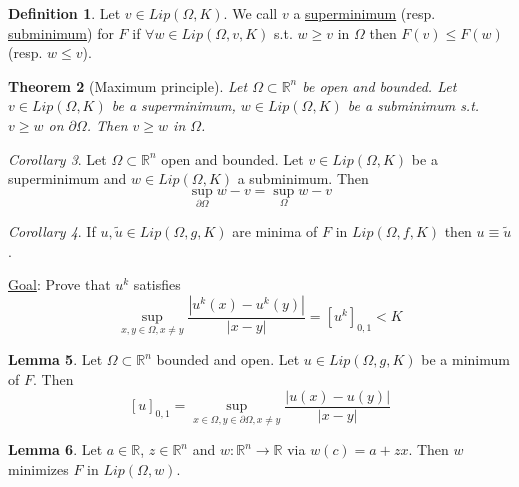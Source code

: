 \documentclass[a4paper, 12pt]{article}
\theoremstyle{plain}
\newtheorem{theorem}{Theorem}[section] %
\theoremstyle{definition}
\newtheorem{definition}[theorem]{Definition} %
\theoremstyle{lemma}
\newtheorem{lemma}[theorem]{Lemma}
\theoremstyle{remark}
\theoremstyle{corollary}
\newtheorem{corollary}[theorem]{Corollary}
\theoremstyle{example}
\begin{document}
	\begin{definition}
		Let $v \in Lip(\Omega,K)$. We call $v$ a \underline{superminimum} (resp. \underline{subminimum}) for $F$ if $\forall w \in Lip(\Omega, v, K)$ s.t. $w \geq v$ in $\Omega$ then $F(v) \leq F(w)$ (resp. $w\leq v$).
	\end{definition}
	\begin{theorem}[Maximum principle]
		Let $\Omega \subset \mathbb{R}^n$ be open and bounded. Let $v \in Lip(\Omega,K)$ be a superminimum, $w \in Lip(\Omega,K)$ be a subminimum s.t. $v \geq w$ on $\partial \Omega$. Then $v \geq w$ in $\Omega$.
	\end{theorem}
	\begin{corollary}
		Let $\Omega\subset \mathbb{R}^n$ open and bounded. Let $v \in Lip(\Omega, K)$ be a superminimum and $w \in Lip(\Omega, K)$ a subminimum. Then \[\sup_{\partial \Omega} w-v = \sup_{\Omega} w-v\]
	\end{corollary}
	\begin{corollary}
		If $u, \tilde{u} \in Lip(\Omega,g,K)$ are minima of $F$ in $Lip(\Omega,f,K)$ then $u \equiv \tilde{u}$.
	\end{corollary}
	\underline{Goal}: Prove that $u^k$ satisfies \[\sup_{x,y \in \Omega, x \neq y} \frac{\left|u^k(x) - u^k(y)\right|}{\left|x-y\right|} = [u^k]_{0,1} < K\]
	\begin{lemma}
		Let $\Omega \subset \mathbb{R}^n$ bounded and open. Let $u \in Lip(\Omega,g,K)$ be a minimum of $F$. Then \[[u]_{0,1} = \sup_{x \in \Omega, y \in \partial \Omega, x \neq y} \frac{\left|u(x)-u(y)\right|}{\left|x-y\right|}\]
	\end{lemma}
	\begin{lemma}
		Let $a \in \mathbb{R}$, $z \in \mathbb{R}^n$ and $w:\mathbb{R}^n \to \mathbb{R}$ via $w(c) = a+zx$. Then $w$ minimizes $F$ in $Lip(\Omega,w)$. 
	\end{lemma}
\end{document}
